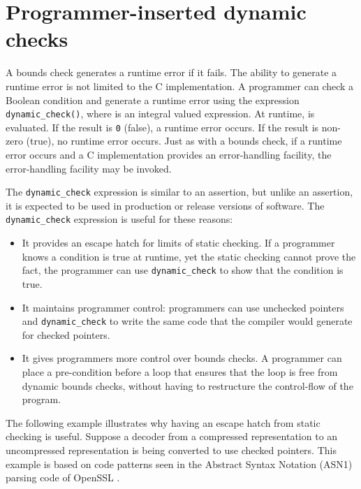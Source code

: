 \section{Programmer-inserted dynamic checks}
\label{section:programmer-dynamic-checks}

A bounds check generates a runtime error if it fails. The ability to
generate a runtime error is not limited to the C implementation. A
programmer can check a Boolean condition and generate a runtime error
using the expression \texttt{dynamic\_check(}\texttt{)}, where
 is an integral valued expression. At runtime,  is
evaluated. If the result is \texttt{0} (false), a runtime error occurs.
If the result is non-zero (true), no runtime error occurs. Just as with
a bounds check, if a runtime error occurs and a C implementation
provides an error-handling facility, the error-handling facility may be
invoked.

The \texttt{dynamic\_check} expression is similar to an assertion, but
unlike an assertion, it is expected to be used in production or release
versions of software. The \texttt{dynamic\_check} expression is useful
for these reasons:

\begin{itemize}
\item
  It provides an escape hatch for limits of static checking. If a
  programmer knows a condition is true at runtime, yet the static
  checking cannot prove the fact, the programmer can use
  \texttt{dynamic\_check} to show that the condition is true.
\item
  It maintains programmer control: programmers can use unchecked pointers
  and \texttt{dynamic\_check} to write the same code that the compiler
  would generate for checked pointers.
\item
  It gives programmers more control over bounds checks. A programmer can
  place a pre-condition before a loop that ensures that the loop is free
  from dynamic bounds checks, without having to restructure the
  control-flow of the program.
\end{itemize}

The following example illustrates why having an escape hatch from static
checking is useful. Suppose a decoder from a compressed representation
to an uncompressed representation is being converted to use checked
pointers. This example is based on code patterns seen in the Abstract
Syntax Notation (ASN1) parsing code of OpenSSL \cite{OpenSSL2015}.

